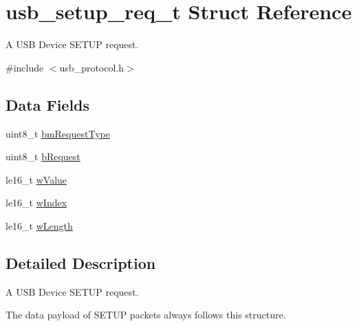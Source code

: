 \hypertarget{structusb__setup__req__t}{
\section{usb\-\_\-setup\-\_\-req\-\_\-t \-Struct \-Reference}
\label{structusb__setup__req__t}
}


\-A \-U\-S\-B \-Device \-S\-E\-T\-U\-P request.  




{\ttfamily \#include $<$usb\-\_\-protocol.\-h$>$}

\subsection*{\-Data \-Fields}
\begin{DoxyCompactItemize}
\item 
uint8\-\_\-t \hyperlink{structusb__setup__req__t_a4d0bc5061aba087bd50d83c5a120b833}{bm\-Request\-Type}
\item 
uint8\-\_\-t \hyperlink{structusb__setup__req__t_ac88656bbea11e32e0be42cd178eba600}{b\-Request}
\item 
le16\-\_\-t \hyperlink{structusb__setup__req__t_ab5516d82c87a1334e7ca6fa3bb418faa}{w\-Value}
\item 
le16\-\_\-t \hyperlink{structusb__setup__req__t_ae6ca45a24d06a2ccef7a06b71d1b1699}{w\-Index}
\item 
le16\-\_\-t \hyperlink{structusb__setup__req__t_a2e8a9bbc9ed2e64335345338a5b4ce1e}{w\-Length}
\end{DoxyCompactItemize}


\subsection{\-Detailed \-Description}
\-A \-U\-S\-B \-Device \-S\-E\-T\-U\-P request. 

\-The data payload of \-S\-E\-T\-U\-P packets always follows this structure. 

